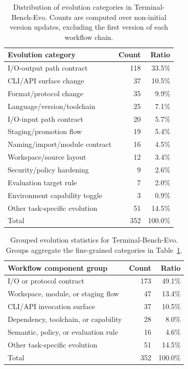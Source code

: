 \documentclass{llmxive}
\begin{document}
\begin{table}[t]
\centering
\small
\begin{tabular}{lrr}
\toprule
\textbf{Evolution category} & \textbf{Count} & \textbf{Ratio} \\
\midrule
I/O-output path contract & 118 & 33.5\% \\
CLI/API surface change & 37 & 10.5\% \\
Format/protocol change & 35 & 9.9\% \\
Language/version/toolchain & 25 & 7.1\% \\
I/O-input path contract & 20 & 5.7\% \\
Staging/promotion flow & 19 & 5.4\% \\
Naming/import/module contract & 16 & 4.5\% \\
Workspace/source layout & 12 & 3.4\% \\
Security/policy hardening & 9 & 2.6\% \\
Evaluation target rule & 7 & 2.0\% \\
Environment capability toggle & 3 & 0.9\% \\
Other task-specific evolution & 51 & 14.5\% \\
\midrule
Total & 352 & 100.0\% \\
\bottomrule
\end{tabular}
\caption{Distribution of evolution categories in Terminal-Bench-Evo. Counts are computed over non-initial version updates, excluding the first version of each workflow chain.}
\label{tab:terminal_bench_evo_categories}
\end{table}

\begin{table}[t]
\centering
\small
\begin{tabular}{lrr}
\toprule
\textbf{Workflow component group} & \textbf{Count} & \textbf{Ratio} \\
\midrule
I/O or protocol contract & 173 & 49.1\% \\
Workspace, module, or staging flow & 47 & 13.4\% \\
CLI/API invocation surface & 37 & 10.5\% \\
Dependency, toolchain, or capability & 28 & 8.0\% \\
Semantic, policy, or evaluation rule & 16 & 4.6\% \\
Other task-specific evolution & 51 & 14.5\% \\
\midrule
Total & 352 & 100.0\% \\
\bottomrule
\end{tabular}
\caption{Grouped evolution statistics for Terminal-Bench-Evo. Groups aggregate the fine-grained categories in Table~\ref{tab:terminal_bench_evo_categories}.}
\label{tab:terminal_bench_evo_component_groups}
\end{table}
\end{document}
